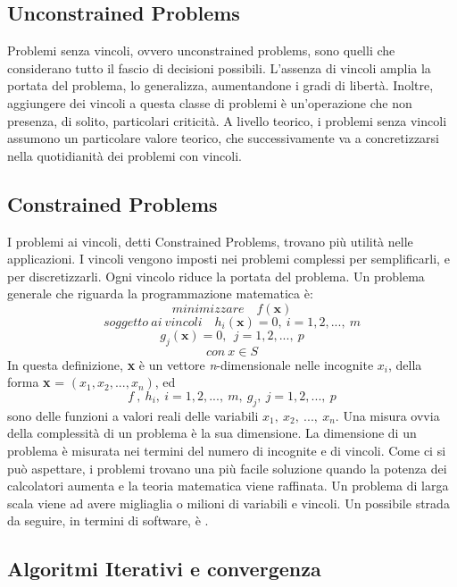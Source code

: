 \documentclass{article}
\begin{document}
\subsection{Unconstrained Problems}
Problemi senza vincoli, ovvero unconstrained problems, sono quelli che considerano tutto il fascio 
di decisioni possibili. L'assenza di vincoli amplia la portata del problema, lo generalizza, aumentandone
i gradi di libertà. Inoltre, aggiungere dei vincoli a questa classe di problemi è un'operazione 
che non presenza, di solito, particolari criticità. A livello teorico, i problemi senza vincoli
assumono un particolare valore teorico, che successivamente va a concretizzarsi nella quotidianità
dei problemi con vincoli.

\subsection{Constrained Problems}
I problemi ai vincoli, detti Constrained Problems, trovano più utilità nelle applicazioni. I vincoli
vengono imposti nei problemi complessi per semplificarli, e per discretizzarli. Ogni vincolo 
riduce la portata del problema. Un problema generale che riguarda la programmazione matematica è: 
\[minimizzare \quad  f(\textbf{x}) \] 
\[soggetto \ ai \ vincoli \quad h_i(\textbf{x})=0, \ i= 1,2, ..., \ m \] \[g_j(\textbf{x})=0,\ \ j= 1,2, ..., \ p  \] 
\[con \  x \in \textit{S}\] 
In questa definizione, \textbf{x} è un vettore \textit{n}-dimensionale nelle incognite \(x_i\),
della forma \textbf{x} = \( (x_1, x_2, ..., x_n) \), ed \[ \textit{f} \ , \ \textit{\(h_i\)},  \ i= 1,2, ...,\ m,  
\ \textit{\(g_j\)}, \ j= 1,2, ..., \ p \] sono delle funzioni a valori reali delle variabili 
\(x_1, \ x_2, \ ..., \ x_n\).
Una misura ovvia della complessità di un problema è la sua dimensione. 
La dimensione di un problema è misurata nei termini del numero di incognite e
di vincoli. Come ci si può aspettare, i problemi trovano una più facile soluzione
quando la potenza dei calcolatori aumenta e la teoria matematica viene raffinata.
Un problema di larga scala viene ad avere migliaglia o milioni di variabili e vincoli.
Un possibile strada da seguire, in termini di software, è \textcite{Gecode}.

\subsection{Algoritmi Iterativi e convergenza}
\end{document}
